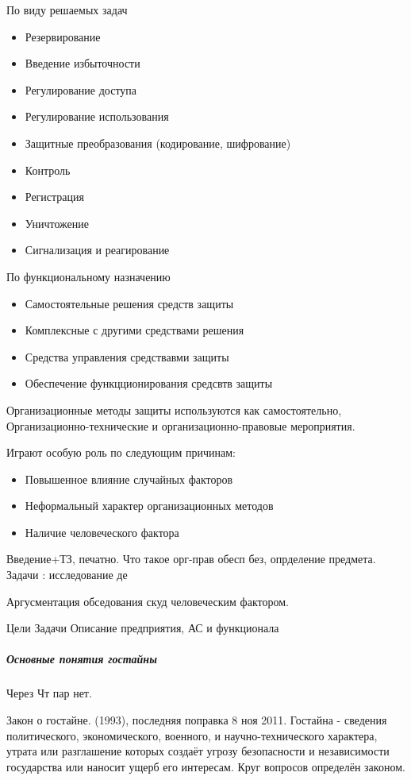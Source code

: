 \documentclass[a4paper,12pt]{report}
\begin{document}
	По виду решаемых задач
	\begin{itemize}
	\item	Резервирование
	\item	Введение избыточности
	\item	Регулирование доступа
	\item	Регулирование использования
	\item	Защитные преобразования (кодирование, шифрование)
	\item	Контроль
	\item	Регистрация
	\item	Уничтожение
	\item	Сигнализация и реагирование
	\end{itemize}


	По функциональному назначению
	\begin{itemize}
	\item	Самостоятельные решения средств защиты
	\item	Комплексные с другими средствами решения
	\item	Средства управления средствавми защиты
	\item	Обеспечение функцционирования средсвтв защиты
	\end{itemize}

	Организационные методы защиты используются как самостоятельно,
	Организационно-технические и организационно-правовые мероприятия.

	Играют особую роль по следующим причинам:
	\begin{itemize}
	\item	Повышенное влияние случайных факторов
	\item	Неформальный характер организационных методов
	\item	Наличие человеческого фактора
	\end{itemize}



	Введение+ТЗ, печатно.
	Что такое орг-прав обесп без, опрделение предмета.
	Задачи : исследование де

	Аргусментация обседования скуд человеческим фактором.


	Цели Задачи Описание предприятия, АС и функционала



	\subparagraph{Основные понятия гостайны}
	Через Чт пар нет.

	Закон о гостайне. (1993), последняя поправка 8 ноя 2011.
	Гостайна - сведения политического, экономического, военного, и научно-технического характера, утрата или разглашение которых создаёт угрозу безопасности и независимости государства или наносит ущерб его интересам.
	Круг вопросов определён законом.
\end{document}
